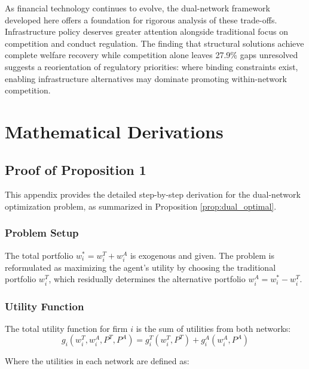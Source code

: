 \documentclass[12pt]{article}
\begin{document}
As financial technology continues to evolve, the dual-network framework developed here offers a foundation for rigorous analysis of these trade-offs. Infrastructure policy deserves greater attention alongside traditional focus on competition and conduct regulation. The finding that structural solutions achieve complete welfare recovery while competition alone leaves 27.9\% gaps unresolved suggests a reorientation of regulatory priorities: where binding constraints exist, enabling infrastructure alternatives may dominate promoting within-network competition.



\newpage
\appendix

\section{Mathematical Derivations}
\label{app:derivation}
\subsection{Proof of Proposition 1}

This appendix provides the detailed step-by-step derivation for the dual-network optimization problem, as summarized in Proposition \ref{prop:dual_optimal}.

\subsubsection{Problem Setup}
The total portfolio $w_i^* = w_i^T + w_i^A$ is exogenous and given. The problem is reformulated as maximizing the agent's utility by choosing the traditional portfolio $w_i^T$, which residually determines the alternative portfolio $w_i^A = w_i^* - w_i^T$.

\subsubsection{Utility Function}
The total utility function for firm $i$ is the sum of utilities from both networks:
\begin{equation}
g_i(w_i^T, w_i^A, P^T, P^A) = g_i^T(w_i^T, P^T) + g_i^A(w_i^A, P^A)
\end{equation}

Where the utilities in each network are defined as:
\end{document}
